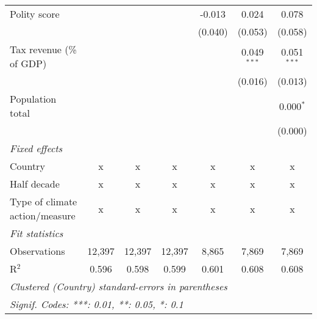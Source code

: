 \begin{tabular}{lcccccc}
   Polity score                                                  &         &                &                & -0.013         & 0.024          & 0.078\\   
                                                                 &         &                &                & (0.040)        & (0.053)        & (0.058)\\   
   Tax revenue (\% of GDP)                                       &         &                &                &                & 0.049$^{***}$  & 0.051$^{***}$\\   
                                                                 &         &                &                &                & (0.016)        & (0.013)\\   
   Population total                                              &         &                &                &                &                & 0.000$^{*}$\\   
                                                                 &         &                &                &                &                & (0.000)\\   
   \emph{Fixed effects}\\
   Country                                                       & x       & x              & x              & x              & x              & x\\  
   Half decade                                                   & x       & x              & x              & x              & x              & x\\  
   Type of climate action/measure                                & x       & x              & x              & x              & x              & x\\  
   \midrule \emph{Fit statistics}\\
   Observations                                                  & 12,397  & 12,397         & 12,397         & 8,865          & 7,869          & 7,869\\  
   R$^2$                                                         & 0.596   & 0.598          & 0.599          & 0.601          & 0.608          & 0.608\\  
   \midrule
   \multicolumn{7}{l}{\emph{Clustered (Country) standard-errors in parentheses}}\\
   \multicolumn{7}{l}{\emph{Signif. Codes: ***: 0.01, **: 0.05, *: 0.1}}\\
\end{tabular}
\par\endgroup


